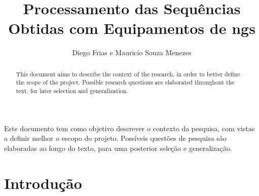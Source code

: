 \documentclass[12pt]{article}
\title{Processamento das Sequências Obtidas com Equipamentos de \gls{ngs}}
\author{Diego Frias e Mauricio Souza Menezes\\}
\begin{document}

\maketitle

\begin{resumo}
    Este documento tem como objetivo descrever o contexto da pesquisa, com vistas a definir melhor o escopo do projeto. Possíveis questões de pesquisa são elaboradas ao longo do texto, para uma posterior seleção e generalização.
\end{resumo}


\begin{abstract}
    \begin{otherlanguage}{english}
        This document aims to describe the context of the research, in order to better define the scope of the project. Possible research questions are elaborated throughout the text, for later selection and generalization.
    \end{otherlanguage}
\end{abstract}


\section{Introdução}
\end{document}
